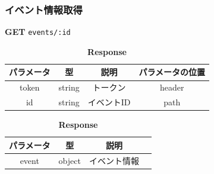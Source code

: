 \subsubsection*{イベント情報取得}
\textbf{GET} \texttt{events/:id}
\begin{table}[H]
  \begin{minipage}
    {0.5\hsize} \centering \captionsetup{labelformat=empty,labelsep=none}
    \caption{\textbf{Request}}
    \begin{tabular}{|c|c|c|c|} \hline
      パラメータ & 型      & 説明     & パラメータの位置 \\ \hline \hline
      token & string & トークン   & header   \\ \hline
      id    & string & イベントID & path     \\ \hline
    \end{tabular}
  \end{minipage}
  \begin{minipage}
    {0.5\hsize} \centering \captionsetup{labelformat=empty,labelsep=none}
    \caption{\textbf{Response}}
    \begin{tabular}{|c|c|c|c|} \hline
      パラメータ & 型      & 説明     \\ \hline \hline
      event & object & イベント情報 \\ \hline
    \end{tabular}
  \end{minipage}
\end{table}

